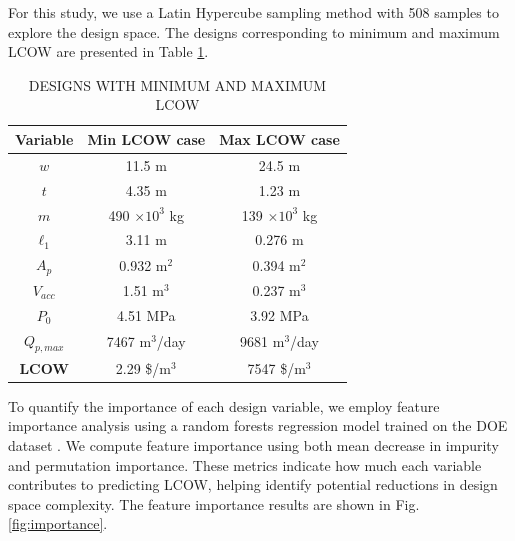\documentclass[twocolumn,10pt]{asme2e}
\begin{document}
For this study, we use a Latin Hypercube sampling method with 508 samples to explore the design space. The designs corresponding to minimum and maximum LCOW are presented in Table \ref{tab:doe}.
\begin{table}
    \centering
    \caption{DESIGNS WITH MINIMUM AND MAXIMUM LCOW}
    \begin{tabular}{ccc}
        \hline
        \textbf{Variable} & \textbf{Min LCOW case} & \textbf{Max LCOW case} \\
        \hline
        $w$ & 11.5 m & 24.5 m \\
        $t$ & 4.35 m & 1.23 m \\
        $m$ & 490 $\times10^3$ kg & 139 $\times10^3$ kg \\
        $\ell_1$ & 3.11 m & 0.276 m \\
        $A_p$ & 0.932 m$^2$ & 0.394 m$^2$ \\
        $V_{acc}$ & 1.51 m$^3$ & 0.237 m$^3$ \\
        $P_0$ & 4.51 MPa & 3.92 MPa \\
        $Q_{p,max}$ & 7467 m$^3$/day & 9681 m$^3$/day \\
        \hline
        \textbf{LCOW} & 2.29 \$/m$^3$ & 7547 \$/m$^3$ \\
        \hline
    \end{tabular}
    \label{tab:doe}
\end{table}

To quantify the importance of each design variable, we employ feature importance analysis using a random forests regression model trained on the DOE dataset \cite{Rogers2006}. We compute feature importance using both mean decrease in impurity and permutation importance. These metrics indicate how much each variable contributes to predicting LCOW, helping identify potential reductions in design space complexity. The feature importance results are  shown in Fig. \ref{fig:importance}.
\end{document}
